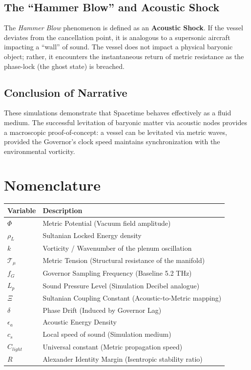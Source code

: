 \documentclass[11pt,a4paper]{article}
\begin{document}
\subsection{The ``Hammer Blow'' and Acoustic Shock}
The \textit{Hammer Blow} phenomenon is defined as an \textbf{Acoustic Shock}. If the vessel deviates from the cancellation point, it is analogous to a supersonic aircraft impacting a ``wall'' of sound. The vessel does not impact a physical baryonic object; rather, it encounters the instantaneous return of metric resistance as the phase-lock (the ghost state) is breached.

\subsection{Conclusion of Narrative}
These simulations demonstrate that Spacetime behaves effectively as a fluid medium. The successful levitation of baryonic matter via acoustic nodes provides a macroscopic proof-of-concept: a vessel can be levitated via metric waves, provided the Governor's clock speed maintains synchronization with the environmental vorticity.

\section*{Nomenclature}

\begin{table}[htbp]
\begin{tabular}{ll}
\textbf{Variable} & \textbf{Description} \\ \hline
$\Phi$ & Metric Potential (Vacuum field amplitude) \\
$\rho_L$ & Sultanian Locked Energy density \\
$k$ & Vorticity / Wavenumber of the plenum oscillation \\
$\mathcal{T}_\mu$ & Metric Tension (Structural resistance of the manifold) \\
$f_G$ & Governor Sampling Frequency (Baseline 5.2 THz) \\
$L_p$ & Sound Pressure Level (Simulation Decibel analogue) \\
$\Xi$ & Sultanian Coupling Constant (Acoustic-to-Metric mapping) \\
$\delta$ & Phase Drift (Induced by Governor Lag) \\
$\epsilon_a$ & Acoustic Energy Density \\
$c_s$ & Local speed of sound (Simulation medium) \\
$C_{light}$ & Universal constant (Metric propagation speed) \\
$R$ & Alexander Identity Margin (Isentropic stability ratio) \\ \hline
\end{tabular}
\end{table}
\end{document}
